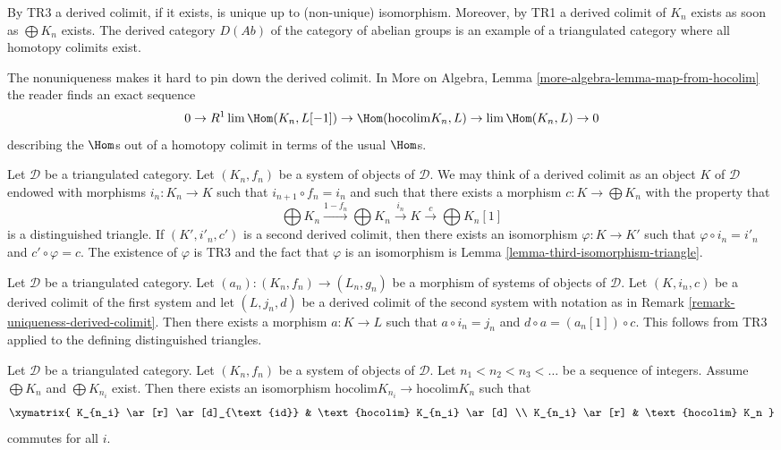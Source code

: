\noindent
By TR3 a derived colimit, if it exists, is unique up to (non-unique)
isomorphism. Moreover, by TR1 a derived colimit of $K_n$ exists
as soon as $\bigoplus K_n$ exists. The derived category $D(\textit{Ab})$
of the category of abelian groups is an example of a triangulated
category where all homotopy colimits exist.

\medskip\noindent
The nonuniqueness makes it hard to pin down the derived colimit. In
More on Algebra, Lemma \ref{more-algebra-lemma-map-from-hocolim}
the reader finds an exact sequence
$$
0 \to R^1\lim \Hom(K_n, L[-1]) \to \Hom(\text{hocolim} K_n, L)
\to \lim \Hom(K_n, L) \to 0
$$
describing the $\Hom$s out of a homotopy colimit in terms of the
usual $\Hom$s.

\begin{remark}
\label{remark-uniqueness-derived-colimit}
Let $\mathcal{D}$ be a triangulated category.
Let $(K_n, f_n)$ be a system of objects of $\mathcal{D}$.
We may think of a derived colimit as an object $K$
of $\mathcal{D}$ endowed with morphisms $i_n : K_n \to K$
such that $i_{n + 1} \circ f_n = i_n$ and such that there
exists a morphism $c : K \to \bigoplus K_n$ with the property that
$$
\bigoplus K_n \xrightarrow{1 - f_n} \bigoplus K_n \xrightarrow{i_n}
K \xrightarrow{c} \bigoplus K_n[1]
$$
is a distinguished triangle. If $(K', i'_n, c')$ is a second
derived colimit, then there exists an isomorphism
$\varphi : K \to K'$ such that $\varphi \circ i_n = i'_n$ and
$c' \circ \varphi = c$. The existence of $\varphi$ is
TR3 and the fact that $\varphi$ is an isomorphism is
Lemma \ref{lemma-third-isomorphism-triangle}.
\end{remark}

\begin{remark}
\label{remark-functoriality-derived-colimit}
Let $\mathcal{D}$ be a triangulated category.
Let $(a_n) : (K_n, f_n) \to (L_n, g_n)$ be a morphism of systems
of objects of $\mathcal{D}$. Let $(K, i_n, c)$ be a derived
colimit of the first system and let $(L, j_n, d)$ be a derived
colimit of the second system with notation as in
Remark \ref{remark-uniqueness-derived-colimit}.
Then there exists a morphism $a : K \to L$
such that $a \circ i_n = j_n$ and $d \circ a = (a_n[1]) \circ c$.
This follows from TR3 applied to the defining distinguished
triangles.
\end{remark}

\begin{lemma}
\label{lemma-hocolim-subsequence}
Let $\mathcal{D}$ be a triangulated category.
Let $(K_n, f_n)$ be a system of objects of $\mathcal{D}$.
Let $n_1 < n_2 < n_3 < \ldots$ be a sequence of integers.
Assume $\bigoplus K_n$ and $\bigoplus K_{n_i}$ exist.
Then there exists an isomorphism
$\text{hocolim} K_{n_i} \to \text{hocolim} K_n$
such that
$$
\xymatrix{
K_{n_i} \ar[r] \ar[d]_{\text{id}} & \text{hocolim} K_{n_i} \ar[d] \\
K_{n_i} \ar[r] & \text{hocolim} K_n
}
$$
commutes for all $i$.
\end{lemma}

